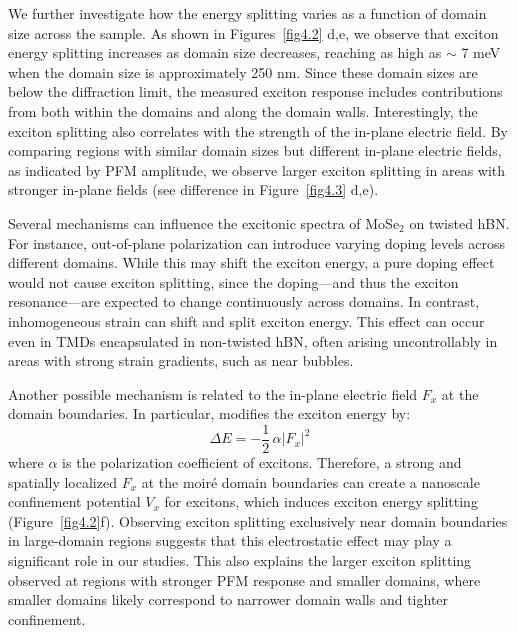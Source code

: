 We further investigate how the energy splitting varies as a function of domain size across the sample. 
As shown in Figures~\ref{fig4.2} d,e, we observe that exciton energy splitting increases as domain size decreases, reaching as high as $\sim$ 7 meV when the domain size is approximately 250 nm.
Since these domain sizes are below the diffraction limit, the measured exciton response includes contributions from both within the domains and along the domain walls.
Interestingly, the exciton splitting also correlates with the strength of the in-plane electric field. 
By comparing regions with similar domain sizes but different in-plane electric fields, as indicated by PFM amplitude, we observe larger exciton splitting in areas with stronger in-plane fields (see difference in Figure~\ref{fig4.3} d,e).

Several mechanisms can influence the excitonic spectra of MoSe$_2$ on twisted hBN. 
For instance, out-of-plane polarization can introduce varying doping levels across different domains\cite{Cho2025-ai,Choi2024-ei,Soubelet2021-hc}. 
While this may shift the exciton energy, a pure doping effect would not cause exciton splitting, since the doping—and thus the exciton resonance—are expected to change continuously across domains\cite{Cho2025-ai}. 
In contrast, inhomogeneous strain can shift and split exciton energy\cite{Mitioglu2018-qt,Glazov2022-vs}. 
This effect can occur even in TMDs encapsulated in non-twisted hBN, often arising uncontrollably in areas with strong strain gradients, such as near bubbles\cite{Darlington2020-ok}.

Another possible mechanism is related to the in-plane electric field $F_x$ at the domain boundaries. 
In particular, modifies the exciton energy by:
\begin{equation}
\Delta E = -\frac{1}{2}\,\alpha \lvert F_x \rvert^2
\label{eq:stark}
\end{equation} 
where $\alpha$ is the polarization coefficient of excitons\cite{Thureja2022-cv,Pedersen2016-pv}. 
Therefore, a strong and spatially localized $F_x$ at the moiré domain boundaries can create a nanoscale confinement potential $V_x$ for excitons, which induces exciton energy splitting \cite{Hu2024-ua,Heithoff2024-jn,Thureja2022-cv,Thureja2024-og} (Figure~\ref{fig4.2}f). 
Observing exciton splitting exclusively near domain boundaries in large-domain regions suggests that this electrostatic effect may play a significant role in our studies. 
This also explains the larger exciton splitting observed at regions with stronger PFM response and smaller domains, where smaller domains likely correspond to narrower domain walls and tighter confinement.

